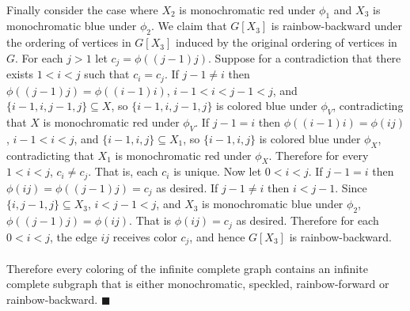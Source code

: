 \documentclass[letterpaper,12pt,oneside,onecolumn]{article}
\begin{document}
\paragraph{}
Finally consider the case where $X_2$ is monochromatic red under $\phi_1$ and $X_3$ is monochromatic blue under $\phi_2$. We claim that $G[X_3]$ is rainbow-backward under the ordering of vertices in $G[X_3]$ induced by the original ordering of vertices in $G$. For each $j>1$ let $c_j = \phi((j-1)j)$. Suppose for a contradiction that there exists $1<i<j$ such that $c_i = c_j$. If $j-1 \neq i$ then $\phi((j-1)j) = \phi((i-1)i)$, $i-1<i<j-1<j$, and $\{i-1,i,j-1,j\} \subseteq X$, so $\{i-1,i,j-1,j\}$ is colored blue under $\phi_V$, contradicting that $X$ is monochromatic red under $\phi_V$. If $j-1 = i$ then $\phi((i-1)i) = \phi(ij)$, $i-1<i<j$, and $\{i-1,i,j\} \subseteq X_1$, so $\{i-1,i,j\}$ is colored blue under $\phi_X$, contradicting that $X_1$ is monochromatic red under $\phi_X$. Therefore for every $1<i<j$, $c_i \neq c_j$. That is, each $c_i$ is unique. Now let $0<i<j$. If $j-1=i$ then $\phi(ij) = \phi((j-1)j) = c_j$ as desired. If $j-1 \neq i$ then $i<j-1$. Since $\{i,j-1,j\} \subseteq X_3$, $i<j-1<j$, and $X_3$ is monochromatic blue under $\phi_2$, $\phi((j-1)j) = \phi(ij)$. That is $\phi(ij) = c_j$ as desired. Therefore for each $0<i<j$, the edge $ij$ receives color $c_j$, and hence $G[X_3]$ is rainbow-backward.
\paragraph{}
Therefore every coloring of the infinite complete graph contains an infinite complete subgraph that is either monochromatic, speckled, rainbow-forward or rainbow-backward. $\blacksquare$
\end{document}
